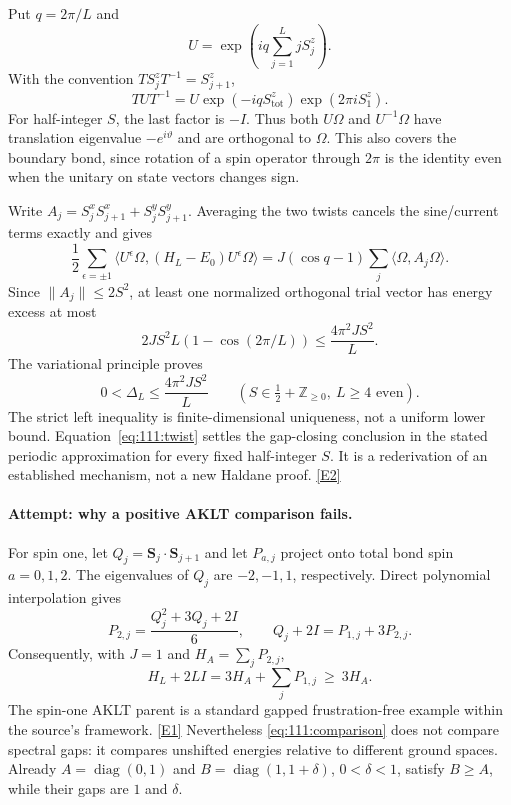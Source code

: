 \documentclass[11pt,a4paper]{article}
\newcommand{\Z}{\mathbb{Z}}
\newcommand{\eref}[2]{\hyperlink{extra:#1:#2}{[E#2]}}
\numberwithin{equation}{section}
\begin{document}
Put $q=2\pi/L$ and
\[
 U=\exp\left(iq\sum_{j=1}^L jS_j^z\right).
\]
With the convention $TS_j^zT^{-1}=S_{j+1}^z$,
\[
 TUT^{-1}=U\exp(-iqS_{\mathrm{tot}}^z)\exp(2\pi iS_1^z).
\]
For half-integer $S$, the last factor is $-I$. Thus both $U\Omega$ and
$U^{-1}\Omega$ have translation eigenvalue $-e^{i\vartheta}$ and are
orthogonal to $\Omega$. This also covers the boundary bond, since rotation
of a spin operator through $2\pi$ is the identity even when the unitary on
state vectors changes sign.

Write $A_j=S_j^xS_{j+1}^x+S_j^yS_{j+1}^y$. Averaging the two twists cancels
the sine/current terms exactly and gives
\[
 \frac12\sum_{\epsilon=\pm1}
 \langle U^\epsilon\Omega,(H_L-E_0)U^\epsilon\Omega\rangle
 =J(\cos q-1)\sum_j\langle\Omega,A_j\Omega\rangle.
\]
Since $\|A_j\|\leq2S^2$, at least one normalized orthogonal trial vector has
energy excess at most
\[
 2JS^2L(1-\cos(2\pi/L))\leq\frac{4\pi^2JS^2}{L}.
\]
The variational principle proves
\begin{equation}\label{eq:111:twist}
 0<\Delta_L\leq\frac{4\pi^2JS^2}{L}
 \qquad(S\in\tfrac12+\Z_{\geq0},\ L\geq4\text{ even}).
\end{equation}
The strict left inequality is finite-dimensional uniqueness, not a uniform
lower bound. Equation~\eqref{eq:111:twist} settles the gap-closing conclusion
in the stated periodic approximation for every fixed half-integer $S$.
It is a rederivation of an established mechanism, not a new Haldane proof.
\eref{111}{2}

\paragraph{Attempt: why a positive AKLT comparison fails.}
For spin one, let $Q_j=\mathbf S_j\cdot\mathbf S_{j+1}$ and let $P_{a,j}$
project onto total bond spin $a=0,1,2$. The eigenvalues of $Q_j$ are
$-2,-1,1$, respectively. Direct polynomial interpolation gives
\[
 P_{2,j}=\frac{Q_j^2+3Q_j+2I}{6},\qquad
 Q_j+2I=P_{1,j}+3P_{2,j}.
\]
Consequently, with $J=1$ and $H_A=\sum_jP_{2,j}$,
\begin{equation}\label{eq:111:comparison}
 H_L+2LI=3H_A+\sum_jP_{1,j}\ \geq\ 3H_A.
\end{equation}
The spin-one AKLT parent is a standard gapped frustration-free example
within the source's framework. \eref{111}{1}
Nevertheless \eqref{eq:111:comparison} does not compare spectral gaps:
it compares unshifted energies relative to different ground spaces.
Already $A=\operatorname{diag}(0,1)$ and
$B=\operatorname{diag}(1,1+\delta)$, $0<\delta<1$, satisfy $B\geq A$,
while their gaps are $1$ and $\delta$.
\end{document}
